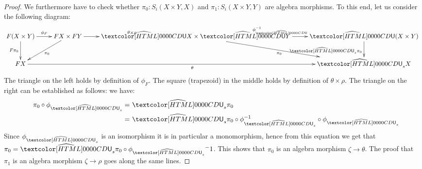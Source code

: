 \begin{proof}
  We furthermore have to check whether $\pi_0 : S_i (X \times Y, X)$
  and $\pi_1 : S_i (X \times Y, Y)$ are algebra morphisms. To this
  end, let us consider the following diagram:
  $$
  \xymatrix{
    F(X \times Y) \ar[r]^{\phi_F} \ar[d]_{F \pi_0}
    &FX \times FY \ar[r]^{\theta \times \rho} \ar[dl]^{\pi_0}
    &\extendfunc{\Und}X \times \extendfunc{\Und}Y \ar[r]^{\phi_{\extendfunc{\Und}}^{-1}} \ar[dr]_{\pi_0}
    &\extendfunc{\Und}(X \times Y) \ar[d]_{\extendfunc{\Und}_s \pi_0}
    \\
    FX \ar[rrr]_{\theta} &&&\extendfunc{\Und}_s X
  }
  $$
  The triangle on the left holds by definition of $\phi_F$. The square
  (trapezoid) in the middle holds by definition of
  $\theta \times \rho$. The triangle on the right can be established
  as follows: we have:
  \begin{align*}
    &&\pi_0 \circ \phi_{\extendfunc{\Und}_s} =&\ \extendfunc{\Und}_s \pi_0 \\
    &&=&\ \extendfunc{\Und}_s \pi_0 \circ \phi_{\extendfunc{\Und}_s}^{-1} \circ \phi_{\extendfunc{\Und}_s}
  \end{align*}
  Since $\phi_{\extendfunc{\Und}_s}$ is an isomorphism it is in particular a monomorphism,
  hence from this equation we get that
  $\pi_0 = \extendfunc{\Und}_s \pi_0 \circ \phi_{\extendfunc{\Und}_s}{^-1}$. This shows that $\pi_0$ is an
  algebra morphism $\zeta \to \theta$. The proof that $\pi_1$ is an
  algebra morphism $\zeta \to \rho$ goes along the same lines.


\end{proof}
